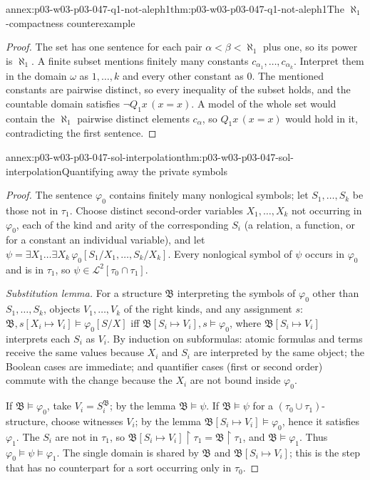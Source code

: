 \begin{annexitem}{annex:p03-w03-p03-047-q1-not-aleph1}{thm:p03-w03-p03-047-q1-not-aleph1}{The \(\aleph_1\)-compactness counterexample}
\begin{proof}
The set has one sentence for each pair \(\alpha<\beta<\aleph_1\) plus one,
so its power is \(\aleph_1\).  A finite subset mentions finitely many
constants \(c_{\alpha_1},\ldots,c_{\alpha_k}\).  Interpret them in the domain
\(\omega\) as \(1,\ldots,k\) and every other constant as \(0\).  The
mentioned constants are pairwise distinct, so every inequality of the subset
holds, and the countable domain satisfies \(\neg Q_1x\,(x=x)\).  A model of
the whole set would contain the \(\aleph_1\) pairwise distinct elements
\(c_\alpha\), so \(Q_1x\,(x=x)\) would hold in it, contradicting the first
sentence.
\end{proof}
\end{annexitem}

\begin{annexitem}{annex:p03-w03-p03-047-sol-interpolation}{thm:p03-w03-p03-047-sol-interpolation}{Quantifying away the private symbols}
\begin{proof}
The sentence \(\varphi_0\) contains finitely many nonlogical symbols; let
\(S_1,\ldots,S_k\) be those not in \(\tau_1\).  Choose distinct second-order
variables \(X_1,\ldots,X_k\) not occurring in \(\varphi_0\), each of the kind
and arity of the corresponding \(S_i\) (a relation, a function, or for a
constant an individual variable), and let
\(\psi=\exists X_1\ldots\exists X_k\,\varphi_0[S_1/X_1,\ldots,S_k/X_k]\).
Every nonlogical symbol of \(\psi\) occurs in \(\varphi_0\) and is in
\(\tau_1\), so \(\psi\in\mathscr L^2[\tau_0\cap\tau_1]\).

\emph{Substitution lemma.}  For a structure \(\mathfrak B\) interpreting the
symbols of \(\varphi_0\) other than \(S_1,\ldots,S_k\), objects
\(V_1,\ldots,V_k\) of the right kinds, and any assignment \(s\):
\(\mathfrak B,s[X_i\mapsto V_i]\models\varphi_0[S/X]\) iff
\(\mathfrak B[S_i\mapsto V_i],s\models\varphi_0\), where
\(\mathfrak B[S_i\mapsto V_i]\) interprets each \(S_i\) as \(V_i\).  By
induction on subformulas: atomic formulas and terms receive the same values
because \(X_i\) and \(S_i\) are interpreted by the same object; the Boolean
cases are immediate; and quantifier cases (first or second order) commute
with the change because the \(X_i\) are not bound inside \(\varphi_0\).

If \(\mathfrak B\models\varphi_0\), take \(V_i=S_i^{\mathfrak B}\); by the
lemma \(\mathfrak B\models\psi\).  If \(\mathfrak B\models\psi\) for a
\((\tau_0\cup\tau_1)\)-structure, choose witnesses \(V_i\); by the lemma
\(\mathfrak B[S_i\mapsto V_i]\models\varphi_0\), hence it satisfies
\(\varphi_1\).  The \(S_i\) are not in \(\tau_1\), so
\(\mathfrak B[S_i\mapsto V_i]\restriction\tau_1=\mathfrak B\restriction\tau_1\),
and \(\mathfrak B\models\varphi_1\).  Thus
\(\varphi_0\models\psi\models\varphi_1\).  The single domain is shared by
\(\mathfrak B\) and \(\mathfrak B[S_i\mapsto V_i]\); this is the step that has
no counterpart for a sort occurring only in \(\tau_0\).
\end{proof}
\end{annexitem}

